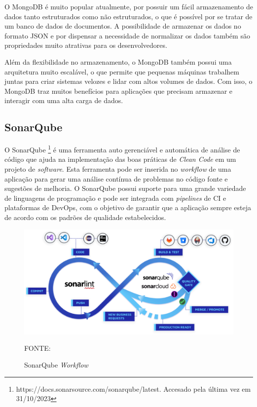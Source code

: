 O MongoDB é muito popular atualmente, por possuir um fácil armazenamento de dados tanto estruturados como não estruturados, 
o que é possível por se tratar de um banco de dados de documentos. A possibilidade de armazenar os dados no formato JSON e por 
dispensar a necessidade de normalizar os dados também são propriedades muito atrativas para os desenvolvedores.

Além da flexibilidade no armazenamento, o MongoDB também possui uma arquitetura muito escalável, o que permite que pequenas máquinas 
trabalhem juntas para criar sistemas velozes e lidar com altos volumes de dados. Com isso, o MongoDB traz muitos benefícios para aplicações 
que precisam armazenar e interagir com uma alta carga de dados.

\subsection{SonarQube}

O SonarQube \footnote{https://docs.sonarsource.com/sonarqube/latest. Accesado pela última vez em 31/10/2023} é uma ferramenta auto 
gerenciável e automática de análise de código que ajuda na implementação das boas práticas de 
\textit{Clean Code} em um projeto de \textit{software}. Esta ferramenta pode ser inserida no \textit{workflow} de uma aplicação para 
gerar uma análise contínua de problemas no código fonte e sugestões de melhoria. O SonarQube possui suporte 
para uma grande variedade de linguagens de programação e pode ser integrada com \textit{pipelines} de CI e 
plataformas de DevOps, com o objetivo de garantir que a aplicação sempre esteja de acordo com os padrões de qualidade estabelecidos.

\begin{figure}[h]
	\centering
	\caption{SonarQube \textit{Workflow}}
	\includegraphics[keepaspectratio=true,scale=0.4]{figuras/sonarqube-workflow.eps}
    \parbox{\linewidth}{\centering FONTE: \cite{SonarQube}}
	\label{fig-sonarqube-workflow}
\end{figure}


